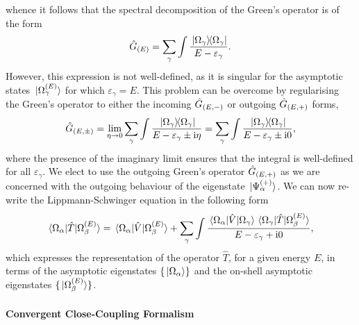 \documentclass[draft]{article}
\begin{document}
whence it follows that the spectral decomposition of the Green's operator is of
the form
\begin{equation}
  \label{eq:greens-operator-spectral}
  \hat{G}_{(E)}
  =
  \sum_{\gamma}\int
  \dfrac
  {
    \ketbra*{\Omega_{\gamma}}{\Omega_{\gamma}}
  }
  {
    E
    -
    \varepsilon_{\gamma}
  }
  .
\end{equation}
However, this expression is not well-defined, as it is singular for the
asymptotic states $\ket*{\Omega_{\gamma}^{(E)}}$ for which
$\varepsilon_{\gamma} = E$.
This problem can be overcome by regularising the Green's operator to either the
incoming $\hat{G}_{(E, -)}$ or outgoing $\hat{G}_{(E, +)}$ forms,
\begin{equation}
  \label{eq:greens-operator-regularise}
  \hat{G}_{(E, \pm)}
  =
  \lim_{\eta \to 0}
  \sum_{\gamma}\int
  \dfrac
  {
    \ketbra*{\Omega_{\gamma}}{\Omega_{\gamma}}
  }
  {
    E - \varepsilon_{\gamma} \pm \mathrm{i}\eta
  }
  =
  \sum_{\gamma}\int
  \dfrac
  {
    \ketbra*{\Omega_{\gamma}}{\Omega_{\gamma}}
  }
  {
    E - \varepsilon_{\gamma} \pm \mathrm{i} 0
  }
  ,
\end{equation}
where the presence of the imaginary limit ensures that the integral is
well-defined for all $\varepsilon_{\gamma}$.
We elect to use the outgoing Green's operator $\hat{G}_{(E, +)}$ as we are
concerned with the outgoing behaviour of the eigenstate
$\ket*{\Psi_{\alpha}^{(+)}}$.
We can now re-write the Lippmann-Schwinger equation in the following form
\begin{equation}
  \label{eq:ls-t}
  \mel*
  {\Omega_{\alpha}}
  {\hat{T}}
  {\Omega_{\beta}^{(E)}}
  =
  \mel*
  {\Omega_{\alpha}}
  {\hat{V} }
  {\Omega_{\beta}^{(E)}}
  +
  \sum_{\gamma}\int
  \dfrac
  {
    \mel*
    {\Omega_{\alpha}}
    {\hat{V}}
    {\Omega_{\gamma}}
    \mel*
    {\Omega_{\gamma}}
    {\hat{T}}
    {\Omega_{\beta}^{(E)}}
  }
  {
    E - \varepsilon_{\gamma} + \mathrm{i} 0
  }
  ,
\end{equation}
which expresses the representation of the operator $\hat{T}$, for a given energy
$E$, in terms of the asymptotic eigenstates $\lbrace\ket*{\Omega_{\alpha}}\rbrace$ and
the on-shell asymptotic eigenstates $\lbrace\ket*{\Omega_{\beta}^{(E)}}\rbrace$.

\paragraph{Convergent Close-Coupling Formalism}
\label{sec:ccc-formalism}
\end{document}
